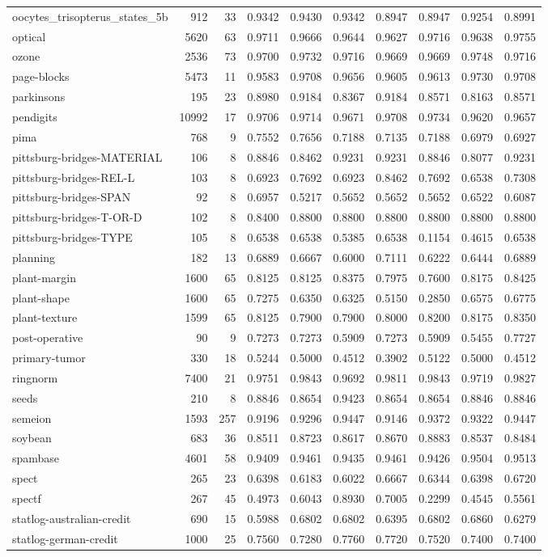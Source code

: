 \documentclass{article}
\begin{document}
\begin{table}
\begin{tabular}{lrrlllllll}
oocytes\_trisopterus\_states\_5b & 912 & 33 & 0.9342 & 0.9430 & 0.9342 & 0.8947 & 0.8947 & 0.9254 & 0.8991\tabularnewline
optical & 5620 & 63 & 0.9711 & 0.9666 & 0.9644 & 0.9627 & 0.9716 & 0.9638 & 0.9755\tabularnewline
ozone & 2536 & 73 & 0.9700 & 0.9732 & 0.9716 & 0.9669 & 0.9669 & 0.9748 & 0.9716\tabularnewline
page-blocks & 5473 & 11 & 0.9583 & 0.9708 & 0.9656 & 0.9605 & 0.9613 & 0.9730 & 0.9708\tabularnewline
parkinsons & 195 & 23 & 0.8980 & 0.9184 & 0.8367 & 0.9184 & 0.8571 & 0.8163 & 0.8571\tabularnewline
pendigits & 10992 & 17 & 0.9706 & 0.9714 & 0.9671 & 0.9708 & 0.9734 & 0.9620 & 0.9657\tabularnewline
pima & 768 & 9 & 0.7552 & 0.7656 & 0.7188 & 0.7135 & 0.7188 & 0.6979 & 0.6927\tabularnewline
pittsburg-bridges-MATERIAL & 106 & 8 & 0.8846 & 0.8462 & 0.9231 & 0.9231 & 0.8846 & 0.8077 & 0.9231\tabularnewline
pittsburg-bridges-REL-L & 103 & 8 & 0.6923 & 0.7692 & 0.6923 & 0.8462 & 0.7692 & 0.6538 & 0.7308\tabularnewline
pittsburg-bridges-SPAN & 92 & 8 & 0.6957 & 0.5217 & 0.5652 & 0.5652 & 0.5652 & 0.6522 & 0.6087\tabularnewline
pittsburg-bridges-T-OR-D & 102 & 8 & 0.8400 & 0.8800 & 0.8800 & 0.8800 & 0.8800 & 0.8800 & 0.8800\tabularnewline
pittsburg-bridges-TYPE & 105 & 8 & 0.6538 & 0.6538 & 0.5385 & 0.6538 & 0.1154 & 0.4615 & 0.6538\tabularnewline
planning & 182 & 13 & 0.6889 & 0.6667 & 0.6000 & 0.7111 & 0.6222 & 0.6444 & 0.6889\tabularnewline
plant-margin & 1600 & 65 & 0.8125 & 0.8125 & 0.8375 & 0.7975 & 0.7600 & 0.8175 & 0.8425\tabularnewline
plant-shape & 1600 & 65 & 0.7275 & 0.6350 & 0.6325 & 0.5150 & 0.2850 & 0.6575 & 0.6775\tabularnewline
plant-texture & 1599 & 65 & 0.8125 & 0.7900 & 0.7900 & 0.8000 & 0.8200 & 0.8175 & 0.8350\tabularnewline
post-operative & 90 & 9 & 0.7273 & 0.7273 & 0.5909 & 0.7273 & 0.5909 & 0.5455 & 0.7727\tabularnewline
primary-tumor & 330 & 18 & 0.5244 & 0.5000 & 0.4512 & 0.3902 & 0.5122 & 0.5000 & 0.4512\tabularnewline
ringnorm & 7400 & 21 & 0.9751 & 0.9843 & 0.9692 & 0.9811 & 0.9843 & 0.9719 & 0.9827\tabularnewline
seeds & 210 & 8 & 0.8846 & 0.8654 & 0.9423 & 0.8654 & 0.8654 & 0.8846 & 0.8846\tabularnewline
semeion & 1593 & 257 & 0.9196 & 0.9296 & 0.9447 & 0.9146 & 0.9372 & 0.9322 & 0.9447\tabularnewline
soybean & 683 & 36 & 0.8511 & 0.8723 & 0.8617 & 0.8670 & 0.8883 & 0.8537 & 0.8484\tabularnewline
spambase & 4601 & 58 & 0.9409 & 0.9461 & 0.9435 & 0.9461 & 0.9426 & 0.9504 & 0.9513\tabularnewline
spect & 265 & 23 & 0.6398 & 0.6183 & 0.6022 & 0.6667 & 0.6344 & 0.6398 & 0.6720\tabularnewline
spectf & 267 & 45 & 0.4973 & 0.6043 & 0.8930 & 0.7005 & 0.2299 & 0.4545 & 0.5561\tabularnewline
statlog-australian-credit & 690 & 15 & 0.5988 & 0.6802 & 0.6802 & 0.6395 & 0.6802 & 0.6860 & 0.6279\tabularnewline
statlog-german-credit & 1000 & 25 & 0.7560 & 0.7280 & 0.7760 & 0.7720 & 0.7520 & 0.7400 & 0.7400\tabularnewline
\end{tabular}
\end{table}
\end{document}
